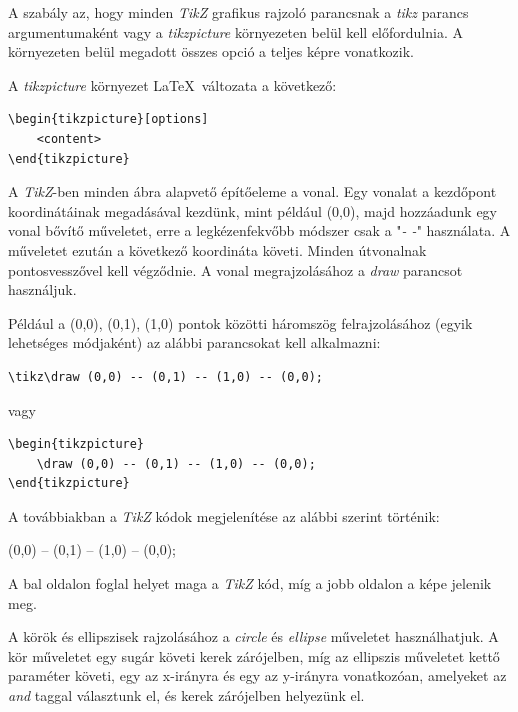 A szabály az, hogy minden \textit{TikZ} grafikus rajzoló parancsnak a \textit{tikz} parancs argumentumaként vagy a \textit{tikzpicture} környezeten belül kell előfordulnia. A környezeten belül megadott összes opció a teljes képre vonatkozik.

A \textit{tikzpicture} környezet \LaTeX\ változata a következő:

\begin{lstlisting}[style=latex]
\begin{tikzpicture}[options]
    <content>
\end{tikzpicture}
\end{lstlisting}


A \textit{TikZ}-ben minden ábra alapvető építőeleme a vonal. Egy vonalat a kezdőpont koordinátáinak megadásával kezdünk, mint például (0,0), majd hozzáadunk egy vonal bővítő műveletet, erre a legkézenfekvőbb módszer csak a "\textit{- -}" használata. A műveletet ezután a következő koordináta követi. Minden útvonalnak pontosvesszővel kell végződnie. A vonal megrajzolásához a \textit{draw} parancsot használjuk.

Például a (0,0), (0,1), (1,0)  pontok közötti háromszög felrajzolásához (egyik lehetséges módjaként) az alábbi parancsokat kell alkalmazni:

\begin{lstlisting}[style=latex]
\tikz\draw (0,0) -- (0,1) -- (1,0) -- (0,0);
\end{lstlisting}

vagy

\begin{lstlisting}[style=latex]
\begin{tikzpicture}
    \draw (0,0) -- (0,1) -- (1,0) -- (0,0);
\end{tikzpicture}
\end{lstlisting}

\noindent
A továbbiakban a \textit{TikZ} kódok megjelenítése az alábbi szerint történik:

\begin{tikzcode}
\draw (0,0) -- (0,1) -- (1,0) -- (0,0);
\end{tikzcode}

\noindent
A bal oldalon foglal helyet maga a \textit{TikZ} kód, míg a jobb oldalon a képe jelenik meg.


A körök és ellipszisek rajzolásához a \textit{circle} és \textit{ellipse} műveletet használhatjuk. A kör műveletet egy sugár követi kerek zárójelben, míg az ellipszis műveletet kettő paraméter követi, egy az x-irányra és egy az y-irányra vonatkozóan, amelyeket az \textit{and} taggal választunk el, és kerek zárójelben helyezünk el. 


